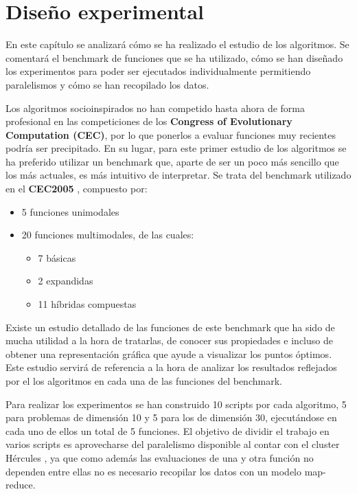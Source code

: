 \chapter{Diseño experimental}

En este capítulo se analizará cómo se ha realizado el estudio de los algoritmos. Se comentará el benchmark de funciones que se ha utilizado, cómo se han diseñado los experimentos para poder ser ejecutados individualmente permitiendo paralelismos y cómo se han recopilado los datos.

Los algoritmos socioinspirados no han competido hasta ahora de forma profesional en las competiciones de los \textbf{Congress of Evolutionary Computation (CEC)}, por lo que ponerlos a evaluar funciones muy recientes podría ser precipitado. En su lugar, para este primer estudio de los algoritmos se ha preferido utilizar un benchmark que, aparte de ser un poco más sencillo que los más actuales, es más intuitivo de interpretar. Se trata del benchmark utilizado en el \textbf{CEC2005} \cite{cec2005-website}, compuesto por:

\begin{itemize}
	\item 5 funciones unimodales
	\item 20 funciones multimodales, de las cuales:
	\begin{itemize}
		\item 7 básicas
		\item 2 expandidas
		\item 11 híbridas compuestas
	\end{itemize}
\end{itemize}

Existe un estudio detallado \cite{cec2005-functions} de las funciones de este benchmark que ha sido de mucha utilidad a la hora de tratarlas, de conocer sus propiedades e incluso de obtener una representación gráfica que ayude a visualizar los puntos óptimos. Este estudio servirá de referencia a la hora de analizar los resultados reflejados por el los algoritmos en cada una de las funciones del benchmark.

Para realizar los experimentos se han construido 10 scripts por cada algoritmo, 5 para problemas de dimensión 10 y 5 para los de dimensión 30, ejecutándose en cada uno de ellos un total de 5 funciones. El objetivo de dividir el trabajo en varios scripts es aprovecharse del paralelismo disponible al contar con el cluster Hércules \cite{cluster-hercules}, ya que como además las evaluaciones de una y otra función no dependen entre ellas no es necesario recopilar los datos con un modelo map-reduce.

